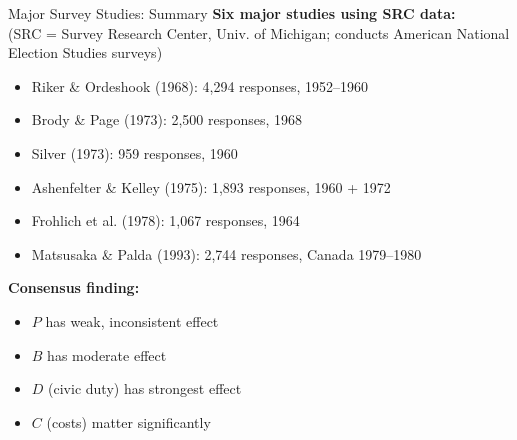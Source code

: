 \documentclass[10pt]{beamer}
\begin{document}
\begin{frame}{Major Survey Studies: Summary}
\textbf{Six major studies using SRC data:}\\ 
\footnotesize{(SRC = Survey Research Center, Univ. of Michigan; conducts American National Election Studies surveys)}

\begin{itemize}
\item Riker \& Ordeshook (1968): 4,294 responses, 1952--1960
\item Brody \& Page (1973): 2,500 responses, 1968
\item Silver (1973): 959 responses, 1960
\item Ashenfelter \& Kelley (1975): 1,893 responses, 1960 + 1972
\item Frohlich et al. (1978): 1,067 responses, 1964
\item Matsusaka \& Palda (1993): 2,744 responses, Canada 1979--1980
\end{itemize}


\textbf{Consensus finding:}
\begin{itemize}
\item $P$ has weak, inconsistent effect
\item $B$ has moderate effect
\item $D$ (civic duty) has \alert{strongest effect}
\item $C$ (costs) matter significantly
\end{itemize}
\end{frame}
\end{document}

